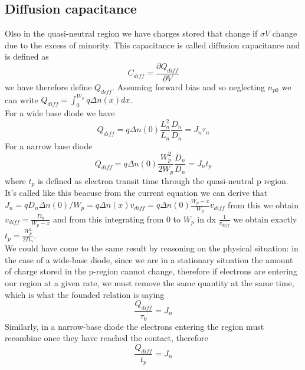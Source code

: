 \subsection{Diffusion capacitance}
Olso in the quasi-neutral region we have charges stored that change if $\sigma V$ change due to the excess of minority. This capacitance is called diffusion capacitance and is defined as 
\begin{equation}
C_{diff}=\frac{\partial Q_{diff}}{\partial V}
\end{equation} 
we have therefore define $Q_{diff}$. Assuming forward bias and so neglecting $n_{p0}$ we can write $Q_{diff}=\int^{W_p}_0 q\Delta n(x) dx$.\\
For a wide base diode we have 
\begin{equation}
Q_{diff}=q\Delta n(0) \frac{L_n^2}{L_n}\frac{D_n}{D_n}=J_n\tau_n
\end{equation}
For a narrow base diode 
\begin{equation}
Q_{diff}=q\Delta n(0) \frac{W_p^2}{2W_p}\frac{D_n}{D_n}=J_nt_p
\end{equation}
where $t_p$ is defined as electron transit time through the quasi-neutral p region.\\

It's called like this beacuse from the current equation we can derive that $J_n=qD_n\Delta n(0)/W_p=q\Delta n(x) v_{diff}=q\Delta n(0)\frac{W_p-x}{W_p} v_{diff}$ from this we obtain $v_{diff}=\frac{D_n}{W_p-x}$ and from this integrating from 0 to $W_p$ in dx $\frac{1}{v_{diff}}$ we obtain exactly $t_p=\frac{W_p^2}{2D_n}$.\\
\vspace{5mm}
We could have come to the same result by reasoning on the physical situation: in the case of a wide-base diode, since we are in a stationary situation the amount of charge stored in the p-region cannot change, therefore if electrons are entering our region at a given rate, we must remove the same quantity at the same time, which is what the founded relation is saying
\begin{equation}
\frac{Q_{diff}}{\tau_0}=J_n
\end{equation}
Similarly, in a narrow-base diode the electrons entering the region must
recombine once they have reached the contact, therefore
\begin{equation}
\frac{Q_{diff}}{t_p}=J_n
\end{equation}
\vspace{5mm}\\


